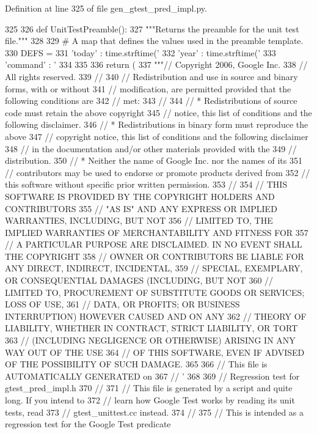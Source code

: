 \-Definition at line 325 of file gen\-\_\-gtest\-\_\-pred\-\_\-impl.\-py.


\begin{DoxyCode}
325 
326 def UnitTestPreamble():
327   """Returns the preamble for the unit test file."""
328 
329   # A map that defines the values used in the preamble template.
330   DEFS = {
331     'today' : time.strftime('%
332     'year' : time.strftime('%
333     'command' : '%
334     }
335 
336   return (
337 """// Copyright 2006, Google Inc.
338 // All rights reserved.
339 //
340 // Redistribution and use in source and binary forms, with or without
341 // modification, are permitted provided that the following conditions are
342 // met:
343 //
344 //     * Redistributions of source code must retain the above copyright
345 // notice, this list of conditions and the following disclaimer.
346 //     * Redistributions in binary form must reproduce the above
347 // copyright notice, this list of conditions and the following disclaimer
348 // in the documentation and/or other materials provided with the
349 // distribution.
350 //     * Neither the name of Google Inc. nor the names of its
351 // contributors may be used to endorse or promote products derived from
352 // this software without specific prior written permission.
353 //
354 // THIS SOFTWARE IS PROVIDED BY THE COPYRIGHT HOLDERS AND CONTRIBUTORS
355 // "AS IS" AND ANY EXPRESS OR IMPLIED WARRANTIES, INCLUDING, BUT NOT
356 // LIMITED TO, THE IMPLIED WARRANTIES OF MERCHANTABILITY AND FITNESS FOR
357 // A PARTICULAR PURPOSE ARE DISCLAIMED. IN NO EVENT SHALL THE COPYRIGHT
358 // OWNER OR CONTRIBUTORS BE LIABLE FOR ANY DIRECT, INDIRECT, INCIDENTAL,
359 // SPECIAL, EXEMPLARY, OR CONSEQUENTIAL DAMAGES (INCLUDING, BUT NOT
360 // LIMITED TO, PROCUREMENT OF SUBSTITUTE GOODS OR SERVICES; LOSS OF USE,
361 // DATA, OR PROFITS; OR BUSINESS INTERRUPTION) HOWEVER CAUSED AND ON ANY
362 // THEORY OF LIABILITY, WHETHER IN CONTRACT, STRICT LIABILITY, OR TORT
363 // (INCLUDING NEGLIGENCE OR OTHERWISE) ARISING IN ANY WAY OUT OF THE USE
364 // OF THIS SOFTWARE, EVEN IF ADVISED OF THE POSSIBILITY OF SUCH DAMAGE.
365 
366 // This file is AUTOMATICALLY GENERATED on %
367 // '%
368 
369 // Regression test for gtest_pred_impl.h
370 //
371 // This file is generated by a script and quite long.  If you intend to
372 // learn how Google Test works by reading its unit tests, read
373 // gtest_unittest.cc instead.
374 //
375 // This is intended as a regression test for the Google Test predicate

\end{DoxyCode}
